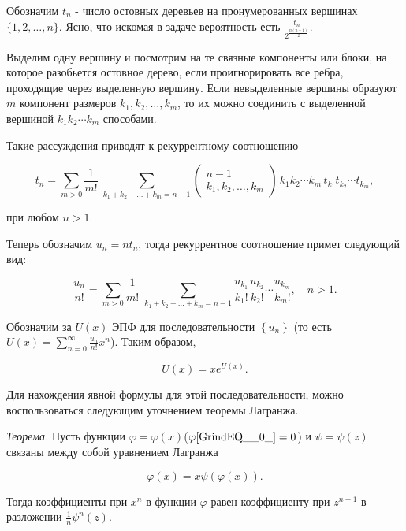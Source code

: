 \begin{ordre}

Обозначим $t_{n} $ - число остовных деревьев на пронумерованных вершинах $\{ 1,2,\ldots ,n\} $. Ясно, что искомая в задаче вероятность есть $\frac{t_{n} }{2^{\frac{n(n-1)}{2} } } $.

Выделим одну вершину и посмотрим на те связные компоненты или блоки, на которое разобьется остовное дерево, если проигнорировать все ребра, проходящие через выделенную вершину. Если невыделенные вершины образуют $m$ компонент размеров $k_{1} ,k_{2} ,\ldots ,k_{m} $, то их можно соединить с выделенной вершиной $k_{1} k_{2} \cdots k_{m} $ способами.

Такие рассуждения приводят к рекуррентному соотношению

\[t_{n} =\sum _{m>0}\frac{1}{m!}  \; \sum _{k_{1} +k_{2} +\ldots +k_{m} =n-1}\left(\begin{array}{c} {n-1} \\ {k_{1} ,k_{2} ,\ldots ,k_{m} } \end{array}\right) \, k_{1} k_{2} \cdots k_{m} \, t_{k_{1} } t_{k_{2} } \cdots t_{k_{m} } ,\] 

при любом $n>1$. 

Теперь обозначим $u_{n} =nt_{n} $, тогда рекуррентное соотношение примет следующий вид:

\[\frac{u_{n} }{n!} =\sum _{m>0}\frac{1}{m!}  \; \sum _{k_{1} +k_{2} +\ldots +k_{m} =n-1}\frac{u_{k_{1} } }{k_{1} !} \frac{u_{k_{2} } }{k_{2} !} \cdots \frac{u_{k_{m} } }{k_{m} !}  ,\quad n>1.\] 

Обозначим за $U(x)$ ЭПФ для последовательности $\left\{u_{n} \right\}$ (то есть $U(x)=\sum _{n=0}^{\infty }\frac{u_{n} }{n!} x^{n}  $). Таким образом,

\[U(x)=xe^{U(x)} .\] 

Для нахождения явной формулы для этой последовательности, можно воспользоваться следующим уточнением теоремы Лагранжа.

\textit{Теорема.} Пусть функции $\varphi =\varphi (x)$($\varphi \eqref{GrindEQ__0_}=0$) и $\psi =\psi (z)$ связаны между собой уравнением Лагранжа 

\[\varphi (x)=x\psi \left(\varphi (x)\right).\] 

Тогда коэффициенты при $x^{n} $ в функции $\varphi $ равен коэффициенту при $z^{n-1} $ в разложении $\frac{1}{n} \psi ^{n} (z)$.

\end{ordre}

